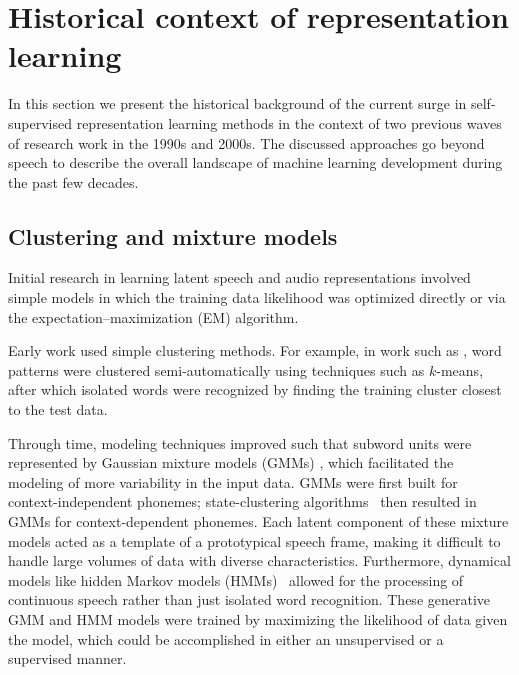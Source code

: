 
\section{Historical context of representation learning}

\label{sec:thirdwave}

In this section we present the historical background of the current surge in
self-supervised representation learning methods in the context of two previous
waves of research work in the 1990s and 2000s. The discussed approaches go
beyond speech to describe the overall landscape of machine learning development during the
past few decades.

\subsection{Clustering and mixture models}

Initial research in learning latent speech and audio representations involved
simple models in which the training data likelihood was optimized directly
or via the expectation--maximization (EM) algorithm.

Early work used simple clustering methods. For example, in work such
as \cite{rabiner_considerations_1979,wilpon_modified_1985}, word patterns were clustered
semi-automatically using techniques such as $k$-means, after which isolated words
were recognized by finding the training cluster closest to 
  the test data.

Through time, modeling techniques improved such that subword units were
represented by Gaussian mixture models (GMMs) \cite{gauvain_maximum_1994}, which facilitated
the modeling of more variability in the input data. GMMs were first built for
context-independent phonemes; state-clustering 
algorithms~\cite{young_state_1994} then resulted in GMMs for context-dependent phonemes. 
Each latent component of these mixture models acted as a template of a
prototypical speech frame, 
making it difficult to handle 
large volumes of data with diverse characteristics. 
Furthermore, dynamical models like hidden Markov models (HMMs)~\cite{bell_adaptation_2021}
allowed for the processing of continuous speech rather than just isolated word
recognition. These generative GMM and HMM models were trained by maximizing the
likelihood of data given the model, which could be accomplished in either an
unsupervised or a supervised manner.

